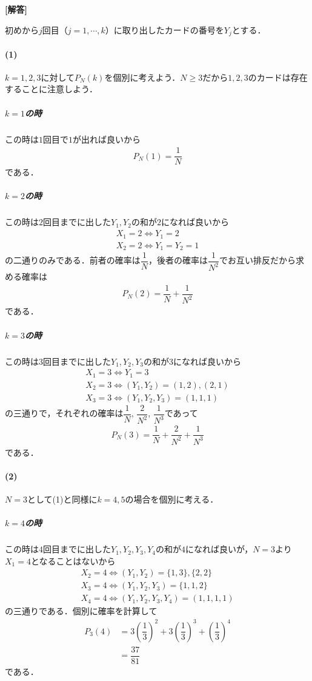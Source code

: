 \documentclass[../../main.tex]{subfiles}
\begin{document}
\begin{oframed}
  
\end{oframed}

{\bf [解答]}

初めから$j$回目（$j=1,\cdots,k$）に取り出したカードの番号を$Y_{j}$とする．

\paragraph{(1)}
$k=1,2,3$に対して$P_{N}(k)$を個別に考えよう．$N \ge 3$だから$1,2,3$のカードは存在することに注意しよう．

\subparagraph{$k=1$の時}
この時は$1$回目で$1$が出れば良いから
\begin{align}
  P_N(1)=\dfrac{1}{N}
\end{align}
である．

\subparagraph{$k=2$の時}
この時は$2$回目までに出した$Y_1,Y_2$の和が$2$になれば良いから
\begin{align}
  X_1 = 2 \iff Y_1 = 2 \\
  X_2 = 2 \iff Y_1 = Y_2 = 1
\end{align}
の二通りのみである．前者の確率は$\dfrac{1}{N}$，後者の確率は$\dfrac{1}{N^2}$でお互い排反だから求める確率は
\begin{align}
  P_N(2)=\dfrac{1}{N}+\dfrac{1}{N^2}
\end{align}
である．

\subparagraph{$k=3$の時}
この時は$3$回目までに出した$Y_1,Y_2,Y_3$の和が$3$になれば良いから
\begin{align}
  X_1 = 3 \iff Y_1 = 3 \\
  X_2 = 3 \iff (Y_1,Y_2) = (1,2), (2,1) \\
  X_3 = 3 \iff (Y_1,Y_2,Y_3) = (1,1,1)
\end{align}
の三通りで，それぞれの確率は$\dfrac{1}{N}$, $\dfrac{2}{N^2}$, $\dfrac{1}{N^3}$であって
\begin{align}
  P_N(3)=\dfrac{1}{N}+\dfrac{2}{N^2}+\dfrac{1}{N^3}
\end{align}
である．
\casesend

\paragraph{(2)}
$N=3$として(1)と同様に$k=4,5$の場合を個別に考える．

\subparagraph{$k=4$の時}
この時は$4$回目までに出した$Y_1,Y_2,Y_3,Y_4$の和が$4$になれば良いが，$N=3$より$X_1=4$となることはないから
\begin{align}
  X_2 = 4 \iff (Y_1,Y_2) = \{1,3\}, \{2,2\} \\
  X_3 = 4 \iff (Y_1,Y_2,Y_3) = \{1,1,2\} \\
  X_4 = 4 \iff (Y_1,Y_2,Y_3,Y_4) = (1,1,1,1)
\end{align}
の三通りである．個別に確率を計算して
\begin{align}
  P_3(4)
  &= 3\left(\dfrac{1}{3}\right)^{2} + 3\left(\dfrac{1}{3}\right)^{3} + \left(\dfrac{1}{3}\right)^{4} \\
  &= \dfrac{37}{81}
\end{align}
である．
\end{document}

